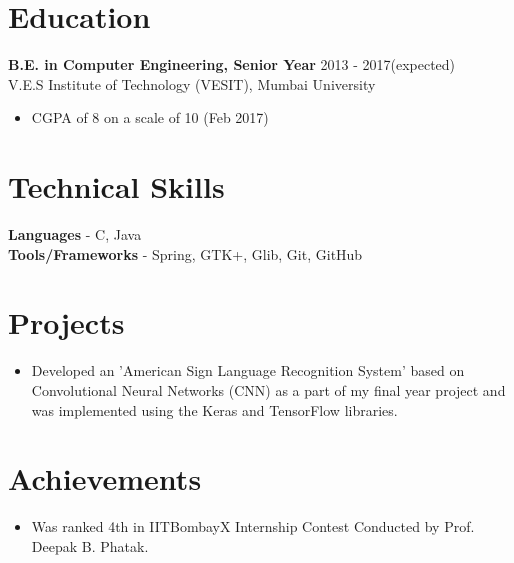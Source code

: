 \documentclass[12pt,margin, centered]{res}
\begin{document}
\begin{resume}
\section{Education}
\vspace{10mm}
\textbf{B.E. in Computer Engineering, Senior Year} \hfill 2013 - 2017(expected) \\
V.E.S Institute of Technology (VESIT), Mumbai University
\begin{itemize}
 \item CGPA of 8 on a scale of 10 (Feb 2017)
\end{itemize}

\section{Technical \hspace{2mm} Skills}
\vspace{10mm}
\textbf{Languages} - C, Java \\
\textbf{Tools/Frameworks} - Spring, GTK+, Glib, Git, GitHub

\section{Projects}
\vspace{10mm}
\begin{itemize}[leftmargin=*]
 \item Developed an 'American Sign Language Recognition System' based on Convolutional Neural Networks (CNN) as a part of my final year project and was implemented using the Keras and TensorFlow libraries.
\end{itemize}


\section{Achievements}
\vspace{12mm}
\begin{itemize}[leftmargin=*]
\item Was ranked 4th in IITBombayX Internship Contest Conducted by Prof. Deepak B. Phatak.
\end{itemize}


\end{resume}
\end{document}
